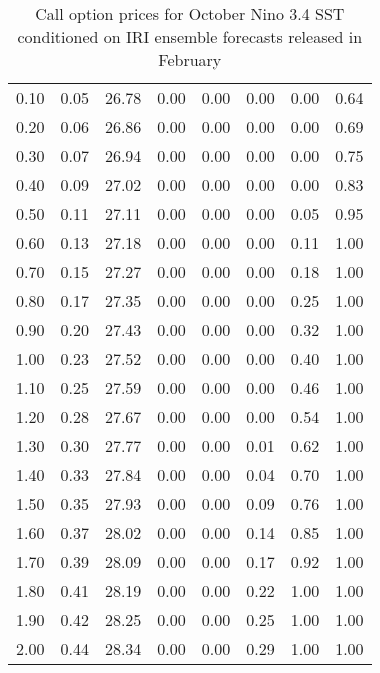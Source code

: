 \begin{table*}[ht]
\begin{tabular}{rrrrrrrr}
  0.10 & 0.05 & 26.78 & 0.00 & 0.00 & 0.00 & 0.00 & 0.64 \\ 
  0.20 & 0.06 & 26.86 & 0.00 & 0.00 & 0.00 & 0.00 & 0.69 \\ 
  0.30 & 0.07 & 26.94 & 0.00 & 0.00 & 0.00 & 0.00 & 0.75 \\ 
  0.40 & 0.09 & 27.02 & 0.00 & 0.00 & 0.00 & 0.00 & 0.83 \\ 
  0.50 & 0.11 & 27.11 & 0.00 & 0.00 & 0.00 & 0.05 & 0.95 \\ 
  0.60 & 0.13 & 27.18 & 0.00 & 0.00 & 0.00 & 0.11 & 1.00 \\ 
  0.70 & 0.15 & 27.27 & 0.00 & 0.00 & 0.00 & 0.18 & 1.00 \\ 
  0.80 & 0.17 & 27.35 & 0.00 & 0.00 & 0.00 & 0.25 & 1.00 \\ 
  0.90 & 0.20 & 27.43 & 0.00 & 0.00 & 0.00 & 0.32 & 1.00 \\ 
  1.00 & 0.23 & 27.52 & 0.00 & 0.00 & 0.00 & 0.40 & 1.00 \\ 
  1.10 & 0.25 & 27.59 & 0.00 & 0.00 & 0.00 & 0.46 & 1.00 \\ 
  1.20 & 0.28 & 27.67 & 0.00 & 0.00 & 0.00 & 0.54 & 1.00 \\ 
  1.30 & 0.30 & 27.77 & 0.00 & 0.00 & 0.01 & 0.62 & 1.00 \\ 
  1.40 & 0.33 & 27.84 & 0.00 & 0.00 & 0.04 & 0.70 & 1.00 \\ 
  1.50 & 0.35 & 27.93 & 0.00 & 0.00 & 0.09 & 0.76 & 1.00 \\ 
  1.60 & 0.37 & 28.02 & 0.00 & 0.00 & 0.14 & 0.85 & 1.00 \\ 
  1.70 & 0.39 & 28.09 & 0.00 & 0.00 & 0.17 & 0.92 & 1.00 \\ 
  1.80 & 0.41 & 28.19 & 0.00 & 0.00 & 0.22 & 1.00 & 1.00 \\ 
  1.90 & 0.42 & 28.25 & 0.00 & 0.00 & 0.25 & 1.00 & 1.00 \\ 
  2.00 & 0.44 & 28.34 & 0.00 & 0.00 & 0.29 & 1.00 & 1.00 \\ 
   \hline
\end{tabular}
\caption{Call option prices for October Nino 3.4 SST conditioned on IRI ensemble forecasts released in February} 
\end{table*}

